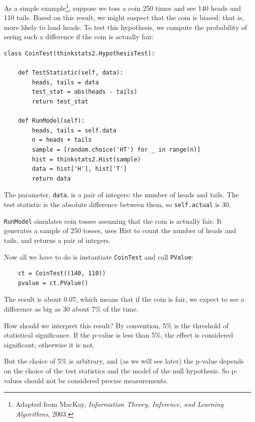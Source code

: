 \documentclass[12pt]{book}
\begin{document}
As a simple example\footnote{Adapted from MacKay, {\it Information
    Theory, Inference, and Learning Algorithms}, 2003.}, suppose we
toss a coin 250 times and see 140 heads and 110 tails.  Based on this
result, we might suspect that the coin is biased; that is, more likely
to land heads.  To test this hypothesis, we compute the
probability of seeing such a difference if the coin is actually
fair:

\begin{verbatim}
class CoinTest(thinkstats2.HypothesisTest):

    def TestStatistic(self, data):
        heads, tails = data
        test_stat = abs(heads - tails)
        return test_stat

    def RunModel(self):
        heads, tails = self.data
        n = heads + tails
        sample = [random.choice('HT') for _ in range(n)]
        hist = thinkstats2.Hist(sample)
        data = hist['H'], hist['T']
        return data
\end{verbatim}

The parameter, \verb"data", is a pair of
integers: the number of heads and tails.  The test statistic is
the absolute difference between them, so \verb"self.actual"
is 30.

\verb"RunModel" simulates coin tosses assuming that the coin is
actually fair.  It generates a sample of 250 tosses, uses Hist
to count the number of heads and tails, and returns a pair of
integers.

Now all we have to do is instantiate \verb"CoinTest" and call
\verb"PValue":

\begin{verbatim}
    ct = CoinTest((140, 110))
    pvalue = ct.PValue()
\end{verbatim}

The result is about 0.07, which means that if the coin is
fair, we expect to see a difference as big as 30 about 7\% of the
time.

How should we interpret this result?  By convention,
5\% is the threshold of statistical significance.  If the
p-value is less than 5\%, the effect is considered significant; otherwise
it is not.
 

But the choice of 5\% is arbitrary, and (as we will see later) the
p-value depends on the choice of the test statistics and
the model of the null hypothesis.  So p-values should not be considered
precise measurements.
\end{document}
